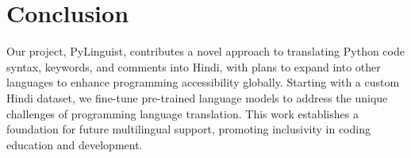 \documentclass[9pt]{article}
\begin{document}
\section{Conclusion}
Our project, PyLinguist, contributes a novel approach to translating Python code syntax, keywords, and comments into Hindi, with plans to expand into other languages to enhance programming accessibility globally. Starting with a custom Hindi dataset, we fine-tune pre-trained language models to address the unique challenges of programming language translation. This work establishes a foundation for future multilingual support, promoting inclusivity in coding education and development. 
\end{document}
